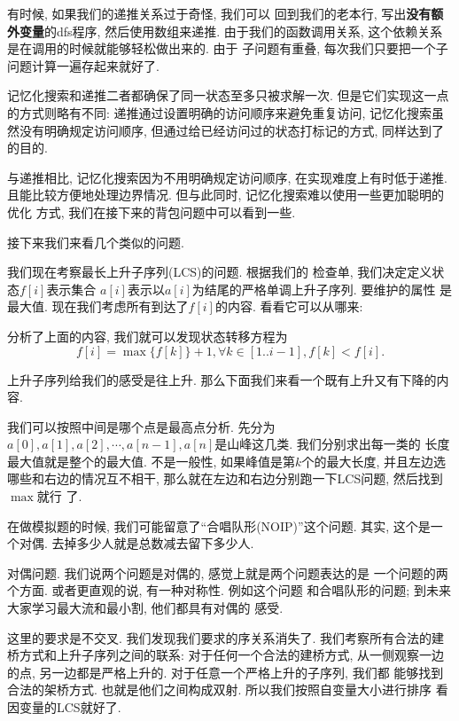  有时候, 如果我们的递推关系过于奇怪, 我们可以
回到我们的老本行, 写出\textbf{没有额外变量}的dfs程序, 然后使用数组来递推. 
由于我们的函数调用关系, 这个依赖关系是在调用的时候就能够轻松做出来的. 由于
子问题有重叠, 每次我们只要把一个子问题计算一遍存起来就好了. 

记忆化搜索和递推二者都确保了同一状态至多只被求解一次. 但是它们实现这一点
的方式则略有不同: 递推通过设置明确的访问顺序来避免重复访问, 
记忆化搜索虽然没有明确规定访问顺序, 但通过给已经访问过的状态打标记的方式, 
同样达到了的目的. 

与递推相比, 记忆化搜索因为不用明确规定访问顺序, 在实现难度上有时低于递推. 
且能比较方便地处理边界情况. 但与此同时, 记忆化搜索难以使用一些更加聪明的优化
方式, 我们在接下来的背包问题中可以看到一些. 


接下来我们来看几个类似的问题. 

 我们现在考察最长上升子序列(LCS)的问题. 根据我们的
检查单, 我们决定定义状态$f[i]$表示集合
$a[i]$表示以$a[i]$为结尾的严格单调上升子序列. 要维护的属性
是最大值. 现在我们考虑所有到达了$f[i]$的内容. 看看它可以从哪来: 


分析了上面的内容, 我们就可以发现状态转移方程为 
$$f[i] = \max \{f[k]\} +1, \forall k\in [1..i-1], f[k]<f[i].$$

上升子序列给我们的感受是往上升. 那么下面我们来看一个既有上升又有下降的内容. 

我们可以按照中间是哪个点是最高点分析. 先分为
$a[0],a[1], a[2],\cdots, a[n-1], a[n]$是山峰这几类. 我们分别求出每一类的
长度最大值就是整个的最大值. 不是一般性, 如果峰值是第$k$个的最大长度, 并且左边选
哪些和右边的情况互不相干, 那么就在左边和右边分别跑一下LCS问题, 然后找到$\max$就行
了. 

在做模拟题的时候, 我们可能留意了``合唱队形(NOIP)''这个问题. 其实, 这个是一个对偶.
去掉多少人就是总数减去留下多少人. 

\begin{remark}
    对偶问题. 我们说两个问题是对偶的, 感觉上就是两个问题表达的是
    一个问题的两个方面. 或者更直观的说, 有一种对称性. 例如这个问题
    和合唱队形的问题; 到未来大家学习最大流和最小割, 他们都具有对偶的
    感受. 
\end{remark}

 这里的要求是不交叉. 我们发现我们要求的序关系消失了. 
我们考察所有合法的建桥方式和上升子序列之间的联系: 对于任何一个合法的建桥方式, 
从一侧观察一边的点, 另一边都是严格上升的. 对于任意一个严格上升的子序列, 我们都
能够找到合法的架桥方式. 也就是他们之间构成双射. 所以我们按照自变量大小进行排序
看因变量的LCS就好了. 

